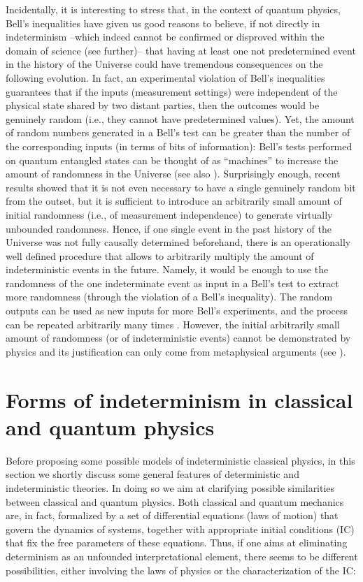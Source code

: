 \documentclass[aps,prl,twocolumn,showpacs,superscriptaddress,groupedaddress, nofootinbib]{revtex4-1}
\begin{document}
Incidentally, it is interesting to stress that, in the context of quantum physics, Bell's inequalities \cite{bell} have given us good reasons to believe, if not directly in indeterminism --which indeed cannot be confirmed or disproved within the domain of science (see further)-- that having at least one not predetermined event in the history of the Universe could have tremendous consequences on the following evolution. In fact, an experimental violation of Bell’s inequalities guarantees that if the inputs (measurement settings) were independent of the physical state shared by two distant parties, then the outcomes would be genuinely random (i.e., they cannot have predetermined values). Yet, the amount of random numbers generated in a Bell's test can be greater than the number of the corresponding inputs (in terms of bits of information): Bell's tests performed on quantum entangled states can be thought of as “machines” to increase the amount of randomness in the Universe (see also \cite{gisin2010}). Surprisingly enough, recent results \cite{renner, putz} showed that it is not even necessary to have a single genuinely random bit from the outset, but it is sufficient to introduce an arbitrarily small amount of initial randomness (i.e., of measurement independence) to generate virtually unbounded randomness. Hence, if one single event in the past history of the Universe was not fully causally determined beforehand, there is an operationally well defined procedure that allows to arbitrarily multiply the amount of indeterministic events in the future. Namely, it would be enough to use the randomness of the one indeterminate event as input in a Bell's test to extract more randomness (through the violation of a Bell's inequality). The random outputs can be used as new inputs for more Bell's experiments, and the process can be repeated arbitrarily many times \cite{amplification}. However, the initial arbitrarily small amount of randomness (or of indeterministic events) cannot be demonstrated by physics and its justification can only come from metaphysical arguments (see \cite{suppes}).



\section{Forms of indeterminism in classical and quantum physics}
Before proposing some possible models of indeterministic classical physics, in this section we shortly discuss some general features of deterministic and indeterministic theories. In doing so we aim at clarifying possible similarities between classical and quantum physics. Both classical and quantum mechanics are, in fact, formalized by a set of differential equations (laws of motion) that govern the dynamics of systems, together with appropriate initial conditions (IC) that fix the free parameters of these equations. Thus, if one aims at eliminating determinism as an unfounded interpretational element, there seems to be different possibilities, either involving the laws of physics or the characterization of the IC:
\end{document}
